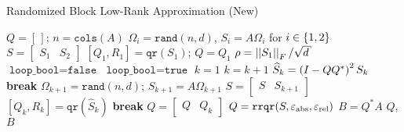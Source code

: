\begin{algorithm}[t]
\caption{Randomized Block Low-Rank Approximation (New)}
\label{alg:rand_new_low_rank}
\begin{algorithmic}[1]
    \State $Q = [\,]$; $n = \texttt{cols}(A)$
    \State $\Omega_{i} = \texttt{rand}(n,d)$, $S_{i} = A\Omega_{i}$
        for $i\in\left\{ 1,2 \right\}$
    \State $S = \begin{bmatrix} S_{1} & S_{2} \end{bmatrix}$
    \State $[Q_{1},R_{1}] = \texttt{qr}(S_{1})$; $Q = Q_{1}$
    \State $\rho = \norm{S_{1}}_{F}/\sqrt{d}$
        \State $\texttt{loop\_bool} = \texttt{false}$
    \Else
        \State $\texttt{loop\_bool} = \texttt{true}$
    \EndIf
    \State $k=1$
        \State $k = k + 1$
        \State $\widehat{S}_{k} = \left( I - QQ^{*} \right)^{2}S_{k}$
        \label{alg_line:rand_new_GS_2x}
            \State \textbf{break}
        \EndIf
        \State $\Omega_{k+1} = \texttt{rand}(n,d)$; $S_{k+1} = A\Omega_{k+1}$
        \State $S = \begin{bmatrix} S & S_{k+1} \end{bmatrix}$
        \State $[Q_{k},R_{k}] = \texttt{qr}(\widehat{S}_{k})$
            \State \textbf{break}
        \EndIf
        \State $Q = \begin{bmatrix}Q & Q_{k}\end{bmatrix}$
    \EndWhile
\State $Q = \texttt{rrqr}(S,\varepsilon_{\text{abs}},\varepsilon_{\text{rel}})$
\State $B = Q^{*}A$
\State \Return $Q$, $B$
\EndFunction
\end{algorithmic}
\end{algorithm}
